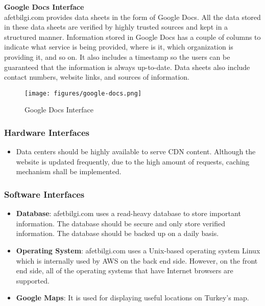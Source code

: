 \documentclass[listof=nochaptergap]{report}
\begin{document}
            \textbf{Google Docs Interface} \\

            afetbilgi.com provides data sheets in the form of Google Docs. All the data stored in these data sheets are verified by highly trusted sources and kept in a structured manner. Information stored in Google Docs has a couple of columns to indicate what service is being provided, where is it, which organization is providing it, and so on. It also includes a timestamp so the users can be guaranteed that the information is always up-to-date. Data sheets also include contact numbers, website links, and sources of information.
            
            \begin{center}
                \begin{figure}[H]
                    \centering
                    \texttt{[image: figures/google-docs.png]}
                    \caption{Google Docs Interface}
                    \label{fig:figure6}
                \end{figure}
            \end{center}
        \subsubsection{Hardware Interfaces}
        \begin{itemize}
            \item Data centers should be highly available to serve CDN content. Although the website is updated frequently, due to the high amount of requests, caching mechanism shall be implemented.
        \end{itemize}
        \subsubsection{Software Interfaces}
        \begin{itemize}
            \item \textbf{Database}: afetbilgi.com uses a read-heavy database to store important information. The database should be secure and only store verified information. The database should be backed up on a daily basis.
            \item \textbf{Operating System}: afetbilgi.com uses a Unix-based operating system Linux which is internally used by AWS on the back end side. However, on the front end side, all of the operating systems that have Internet browsers are supported.
            \item \textbf{Google Maps}: It is used for displaying useful locations on Turkey's map.
        \end{itemize}
\end{document}
